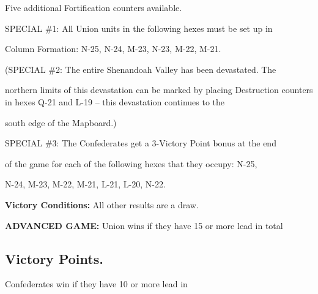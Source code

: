 Five additional Fortification counters available.

\begin{scenariodata}
SPECIAL \#1: All Union units in the following hexes must be set up in\\
\end{scenariodata}

Column Formation: N-25, N-24, M-23, N-23, M-22, M-21.

\begin{scenariodata}
(SPECIAL \#2: The entire Shenandoah Valley has been devastated. The\\
\end{scenariodata}

northern limits of this devastation can be marked by placing Destruction counters in hexes Q-21 and L-19 -- this devastation continues to the

\begin{scenariodata}
south edge of the Mapboard.)\\
\end{scenariodata}

\begin{scenariodata}
SPECIAL \#3: The Confederates get a 3-Victory Point bonus at the end\\
\end{scenariodata}

of the game for each of the following hexes that they occupy: N-25,

\begin{scenariodata}
N-24, M-23, M-22, M-21, L-21, L-20, N-22.\\
\end{scenariodata}

\begin{scenariodata}
\textbf{Victory Conditions:} All other results are a draw.\\
\end{scenariodata}

\begin{scenariodata}
\textbf{ADVANCED GAME:} Union wins if they have 15 or more lead in total\\
\end{scenariodata}

\subsection*{Victory Points.}

\begin{scenariodata}
Confederates win if they have 10 or more lead in\\
\end{scenariodata}

